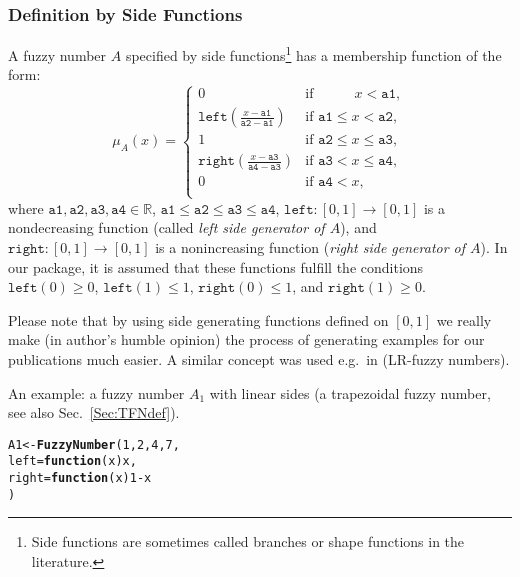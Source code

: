\documentclass[11pt]{article}\usepackage{graphicx, color}
\makeatletter
\newcommand{\hlfunctioncall}[1]{\textcolor[rgb]{0.501960784313725,0,0.329411764705882}{\textbf{#1}}}%
\newenvironment{kframe}{%
 \def\at@end@of@kframe{}%
 \ifinner\ifhmode%
  \def\at@end@of@kframe{\end{minipage}}%
  \begin{minipage}{\columnwidth}%
 \fi\fi%
 \def\FrameCommand##1{\hskip\@totalleftmargin \hskip-\fboxsep
 \colorbox{shadecolor}{##1}\hskip-\fboxsep
     \hskip-\linewidth \hskip-\@totalleftmargin \hskip\columnwidth}%
 \MakeFramed {\advance\hsize-\width
   \@totalleftmargin\z@ \linewidth\hsize
   \@setminipage}}%
 {\par\unskip\endMakeFramed%
 \at@end@of@kframe}
\newenvironment{knitrout}{}{} %
\makeatother
\begin{document}
\subsubsection{Definition by Side Functions}

A fuzzy number $A$ specified by side functions\footnote{Side functions
  are sometimes called branches or shape functions in the literature.}
has a membership function
of the form:
\begin{equation}
\mu_A(x) = \left\{\begin{array}{ll}
0 & \text{if } \phantom{\mathtt{a2}\le\ } x<\mathtt{a1}, \\
\mathtt{left}\left( \frac{x-\mathtt{a1}}{\mathtt{a2-a1}} \right)  & \text{if } \mathtt{a1} \le x < \mathtt{a2}, \\
1 & \text{if } \mathtt{a2}\le x\le\mathtt{a3}, \\
\mathtt{right}\left( \frac{x-\mathtt{a3}}{\mathtt{a4-a3}} \right)  & \text{if } \mathtt{a3} < x \le \mathtt{a4}, \\
0 & \text{if } \mathtt{a4}<x, \\
\end{array}\right.
\end{equation}
where $\mathtt{a1},\mathtt{a2},\mathtt{a3},\mathtt{a4}\in\mathbb{R}$,
$\mathtt{a1}\le\mathtt{a2}\le\mathtt{a3}\le\mathtt{a4}$,
$\mathtt{left}: [0,1]\to[0,1]$ is a nondecreasing function
(called \textit{left side generator of $A$}),
and $\mathtt{right}: [0,1]\to[0,1]$ is a nonincreasing function
(\textit{right side generator of $A$}).
In our package, it is assumed that these functions fulfill the conditions
$\mathtt{left}(0)\ge 0$, $\mathtt{left}(1)\le 1$,
$\mathtt{right}(0)\le 1$, and $\mathtt{right}(1)\ge 0$.


Please note that by using side generating functions defined on $[0,1]$
we really make (in author's humble opinion) the process of generating
examples for our publications much easier.
A similar concept was used e.g.~in \cite{StefaniniSorini2009:eusflat}
(LR-fuzzy numbers).

\bigskip
An example: a fuzzy number $A_1$ with linear sides
(a trapezoidal fuzzy number, see also Sec.~\ref{Sec:TFNdef}).

\begin{knitrout}\small
{}\color{fgcolor}\begin{kframe}
\begin{alltt}
A1 <- \hlfunctioncall{FuzzyNumber}(1, 2, 4, 7,
    left=\hlfunctioncall{function}(x) x,
   right=\hlfunctioncall{function}(x) 1-x
)
\end{alltt}
\end{kframe}
\end{knitrout}
\end{document}
